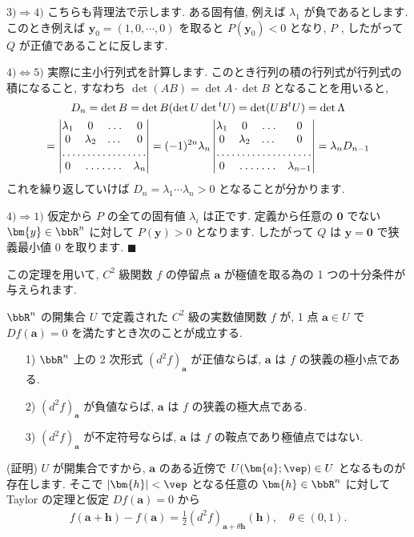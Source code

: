 \documentclass[openany, a4paper, oneside]{jsbook}
\begin{document}
$3)\Rightarrow 4)$
こちらも背理法で示します.
ある固有値, 例えば $\lambda_1$ が負であるとします.
このとき例えば $\bm{y}_0=(1,0,\dotsb,0)$ を取ると $P (\bm{y}_0)<0$ となり,
$P$ , したがって $Q$ が正値であることに反します.

$4)\Leftrightarrow  5)$
実際に主小行列式を計算します.
このとき行列の積の行列式が行列式の積になること,
すなわち $\det (AB) = \det A \cdot \det B$ となることを用いると,
\begin{gather}
D_n
=
\det B
=
\det B ( \det U \det {^t}U )
=
\det ( U B {^t} U )
=
\det \Lambda \\
=
\begin{vmatrix}
\lambda_1 & 0 & \hdotsfor{1} & 0 \\
0 & \lambda_2 & \dots & 0 \\
\hdotsfor{4} \\
0 & \hdotsfor{2} & \lambda_n
\end{vmatrix}
=
(-1)^{2n} \lambda_n
\begin{vmatrix}
\lambda_1 & 0 & \hdotsfor{1} & 0 \\
0 & \lambda_2 & \dots & 0 \\
\hdotsfor{4} \\
0 & \hdotsfor{2} & \lambda_{n-1}
\end{vmatrix}
=
\lambda_n D_{n-1}
\end{gather}
これを繰り返していけば $D_n = \lambda_1 \dotsb \lambda_n >0$ となることが分かります.

$4)\Rightarrow 1)$
仮定から $P$ の全ての固有値 $\lambda_i$ は正です.
定義から任意の $\bm{0}$ でない $\bm{y}\in\bbR^n$ に対して $P ( \bm{y} ) > 0$ となります.
したがって $Q$ は $\bm{y}=\bm{0}$ で狭義最小値 $0$ を取ります.  $\blacksquare$

この定理を用いて,  $C^2$ 級関数 $f$ の停留点 $\bm{a}$ が極値を取る為の
1 つの十分条件が与えられます.

\begin{thm}
$\bbR^n$ の開集合 $U$ で定義された $C^2$ 級の実数値関数 $f$ が,
1 点 $\bm{a} \in U$ で $Df (\bm{a})=0$ を満たすとき次のことが成立する.
\begin{enumerate}
\item[1)] $\bbR^n$ 上の 2 次形式 $(d^2f)_{\bm{a}}$ が正値ならば,  $\bm{a}$ は $f$ の狭義の極小点である.
\item[2)] $(d^2f)_{\bm{a}}$ が負値ならば,  $\bm{a}$ は $f$ の狭義の極大点である.
\item[3)] $(d^2f)_{\bm{a}}$ が不定符号ならば,  $\bm{a}$ は $f$ の鞍点であり極値点ではない.
\end{enumerate}
\end{thm}
(証明)
$U$ が開集合ですから,  $\bm{a}$ のある近傍で $U ( \bm{a} ; \vep ) \in U$ となるものが存在します.
そこで $|\bm{h}|<\vep$ となる任意の $\bm{h}\in\bbR^n$ に対して
Taylor の定理と仮定 $Df (\bm{a})=0$ から
\begin{align}
f ( \bm{a} + \bm{h} ) - f ( \bm{a} )
=
\frac{1} {2} (d^2 f)_{ \bm{a} + \theta \bm{h} } ( \bm{h} ) ,
\quad
\theta \in ( 0,1 ).
\end{align}
\end{document}
